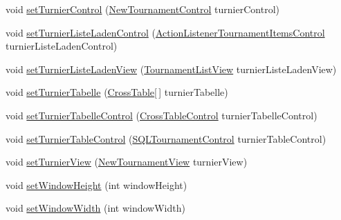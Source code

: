 \begin{DoxyCompactItemize}
\item 
void \hyperlink{classde_1_1turnierverwaltung_1_1control_1_1_main_control_af153f4bbeea999c5e94a5d91a260ccca}{set\+Turnier\+Control} (\hyperlink{classde_1_1turnierverwaltung_1_1control_1_1_new_tournament_control}{New\+Tournament\+Control} turnier\+Control)
\item 
void \hyperlink{classde_1_1turnierverwaltung_1_1control_1_1_main_control_a5fd4af0fac6612412c08decd92dcb994}{set\+Turnier\+Liste\+Laden\+Control} (\hyperlink{classde_1_1turnierverwaltung_1_1control_1_1_action_listener_tournament_items_control}{Action\+Listener\+Tournament\+Items\+Control} turnier\+Liste\+Laden\+Control)
\item 
void \hyperlink{classde_1_1turnierverwaltung_1_1control_1_1_main_control_a14dbaa40ba4ac584d5b9e6523c937cc6}{set\+Turnier\+Liste\+Laden\+View} (\hyperlink{classde_1_1turnierverwaltung_1_1view_1_1_tournament_list_view}{Tournament\+List\+View} turnier\+Liste\+Laden\+View)
\item 
void \hyperlink{classde_1_1turnierverwaltung_1_1control_1_1_main_control_aa374c0928bd36ddb02a3af2881417348}{set\+Turnier\+Tabelle} (\hyperlink{classde_1_1turnierverwaltung_1_1model_1_1_cross_table}{Cross\+Table}\mbox{[}$\,$\mbox{]} turnier\+Tabelle)
\item 
void \hyperlink{classde_1_1turnierverwaltung_1_1control_1_1_main_control_ad868ee47668f9767f9c03f6654105de7}{set\+Turnier\+Tabelle\+Control} (\hyperlink{classde_1_1turnierverwaltung_1_1control_1_1_cross_table_control}{Cross\+Table\+Control} turnier\+Tabelle\+Control)
\item 
void \hyperlink{classde_1_1turnierverwaltung_1_1control_1_1_main_control_af6f560c94077c0285403d2d70940dabb}{set\+Turnier\+Table\+Control} (\hyperlink{classde_1_1turnierverwaltung_1_1control_1_1_s_q_l_tournament_control}{S\+Q\+L\+Tournament\+Control} turnier\+Table\+Control)
\item 
void \hyperlink{classde_1_1turnierverwaltung_1_1control_1_1_main_control_a6ad125a9c062ce55ddec908aaba0eaea}{set\+Turnier\+View} (\hyperlink{classde_1_1turnierverwaltung_1_1view_1_1_new_tournament_view}{New\+Tournament\+View} turnier\+View)
\item 
void \hyperlink{classde_1_1turnierverwaltung_1_1control_1_1_main_control_a1a655b3e392140f1c9769e4deb508346}{set\+Window\+Height} (int window\+Height)
\item 
void \hyperlink{classde_1_1turnierverwaltung_1_1control_1_1_main_control_a1c7a5326de1090ca0658cc411daae3b3}{set\+Window\+Width} (int window\+Width)
\item 

\end{DoxyCompactItemize}
